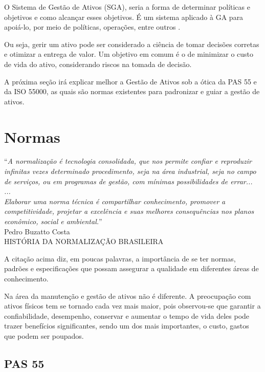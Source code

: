 O Sistema de Gestão de Ativos (SGA), seria a forma de determinar políticas e objetivos e como alcançar esses objetivos. É um sistema aplicado à GA para apoiá-lo, por meio de políticas, operações, entre outros \cite{abraman}. 

Ou seja, gerir um ativo pode ser considerado a ciência de tomar decisões corretas e otimizar a entrega de valor. Um objetivo em comum é o de minimizar o custo de vida do ativo, considerando riscos na tomada de decisão.

A próxima seção irá explicar melhor a Gestão de Ativos sob a ótica da PAS 55 e da ISO 55000, as quais são normas existentes para padronizar e guiar a gestão de ativos.


\section{Normas}
\label{normas}

\begin{flushright}
	“\textit{A normalização é tecnologia consolidada, que nos
permite confiar e reproduzir infinitas vezes determinado
procedimento, seja na área industrial, seja no campo de
serviços, ou em programas de gestão, com mínimas
possibilidades de errar...
\\
...
\\
Elaborar uma norma técnica é compartilhar
conhecimento, promover a competitividade, projetar a
excelência e suas melhores consequências nos planos
econômico, social e ambiental.}”
\\
Pedro Buzatto Costa
\\
HISTÓRIA DA NORMALIZAÇÃO BRASILEIRA
\end{flushright}

A citação acima diz, em poucas palavras, a importância de se ter normas, padrões e especificações que possam assegurar a qualidade em diferentes áreas de conhecimento.

Na área da manutenção e gestão de ativos não é diferente. A preocupação com ativos físicos tem se tornado cada vez mais maior, pois observou-se que garantir a confiabilidade, desempenho, conservar e aumentar o tempo de vida deles pode trazer benefícios significantes, sendo um dos mais importantes, o custo, gastos que podem ser poupados.

\subsection{PAS 55}
\label{pas55}

